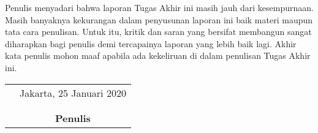 \documentclass{jtetiskripsi}
\begin{document}
Penulis menyadari bahwa laporan Tugas Akhir ini masih jauh dari kesempurnaan. Masih banyaknya kekurangan dalam penyusunan laporan ini baik materi maupun tata cara penulisan. Untuk itu, kritik dan saran yang bersifat membangun sangat diharapkan bagi penulis demi tercapainya laporan yang lebih baik lagi. Akhir kata penulis mohon maaf apabila ada kekeliruan di dalam penulisan Tugas Akhir ini.
\vspace{0.5cm}

\begin{tabular}{p{7.5cm}c}
	&Jakarta, 25 Januari 2020\\
	&\\
	&\\
	&\textbf{Penulis}
\end{tabular}

\end{document}
